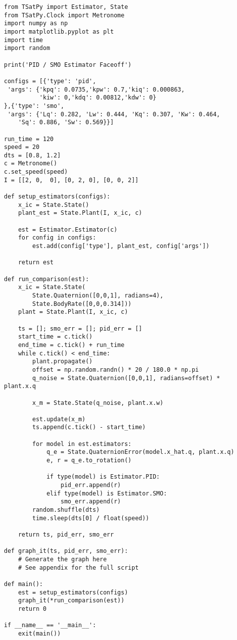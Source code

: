\begin{singlespace}
  \begin{verbatim}
from TSatPy import Estimator, State
from TSatPy.Clock import Metronome
import numpy as np
import matplotlib.pyplot as plt
import time
import random

print('PID / SMO Estimator Faceoff')

configs = [{'type': 'pid',
 'args': {'kpq': 0.0735,'kpw': 0.7,'kiq': 0.000863,
          'kiw': 0,'kdq': 0.00812,'kdw': 0}
},{'type': 'smo',
 'args': {'Lq': 0.282, 'Lw': 0.444, 'Kq': 0.307, 'Kw': 0.464,
    'Sq': 0.886, 'Sw': 0.569}}]

run_time = 120
speed = 20
dts = [0.8, 1.2]
c = Metronome()
c.set_speed(speed)
I = [[2, 0,  0], [0, 2, 0], [0, 0, 2]]

def setup_estimators(configs):
    x_ic = State.State()
    plant_est = State.Plant(I, x_ic, c)

    est = Estimator.Estimator(c)
    for config in configs:
        est.add(config['type'], plant_est, config['args'])

    return est

def run_comparison(est):
    x_ic = State.State(
        State.Quaternion([0,0,1], radians=4),
        State.BodyRate([0,0,0.314]))
    plant = State.Plant(I, x_ic, c)

    ts = []; smo_err = []; pid_err = []
    start_time = c.tick()
    end_time = c.tick() + run_time
    while c.tick() < end_time:
        plant.propagate()
        offset = np.random.randn() * 20 / 180.0 * np.pi
        q_noise = State.Quaternion([0,0,1], radians=offset) * plant.x.q

        x_m = State.State(q_noise, plant.x.w)

        est.update(x_m)
        ts.append(c.tick() - start_time)

        for model in est.estimators:
            q_e = State.QuaternionError(model.x_hat.q, plant.x.q)
            e, r = q_e.to_rotation()

            if type(model) is Estimator.PID:
                pid_err.append(r)
            elif type(model) is Estimator.SMO:
                smo_err.append(r)
        random.shuffle(dts)
        time.sleep(dts[0] / float(speed))

    return ts, pid_err, smo_err

def graph_it(ts, pid_err, smo_err):
    # Generate the graph here
    # See appendix for the full script

def main():
    est = setup_estimators(configs)
    graph_it(*run_comparison(est))
    return 0

if __name__ == '__main__':
    exit(main())
  \end{verbatim}
\nocite{minted}
\end{singlespace}

